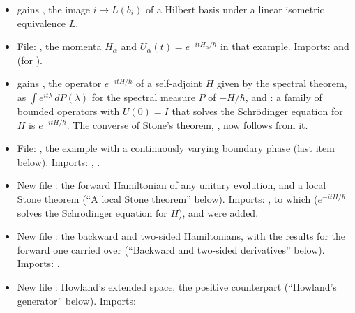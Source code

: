 \documentclass[11pt]{article}
\begin{document}
\begin{itemize}
   and
  .
\item {} gains
  , the image $i \mapsto L(b_i)$ of a Hilbert basis under a linear
  isometric equivalence $L$.
\item File: , the momenta
  $H_\alpha$ and $U_\alpha(t) = e^{-itH_\alpha/\hbar}$ in that example. Imports:
   and  (for
  ).
\item {} gains , the
  operator $e^{-itH/\hbar}$ of a self-adjoint $H$ given by the spectral theorem, as
  $\int e^{it\lambda}\,dP(\lambda)$ for the spectral measure $P$ of $-H/\hbar$, and
  : a family of bounded operators with
  $U(0) = I$ that solves the Schr\"odinger equation for $H$ is $e^{-itH/\hbar}$. The converse of
  Stone's theorem, , now follows
  from it.
\item File: , the example with a
  continuously varying boundary phase (last item below). Imports:
  , .
\item New file : the forward
  Hamiltonian of any unitary evolution, and a local Stone theorem (``A local Stone theorem''
  below). Imports: , to which
   ($e^{-itH/\hbar}$ solves the Schr\"odinger
  equation for $H$),  and
   were added.
\item New file : the backward and
  two-sided Hamiltonians, with the results for the forward one carried over (``Backward and
  two-sided derivatives'' below). Imports: .
\item New file : Howland's extended space, the
  positive counterpart (``Howland's generator'' below). Imports:

\end{itemize}
\end{document}
